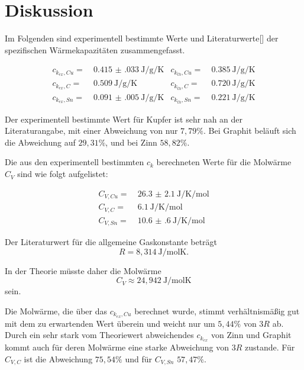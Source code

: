 \section{Diskussion}
\label{sec:Diskussion}

Im Folgenden sind experimentell bestimmte Werte und Literaturwerte[] der spezifischen Wärmekapazitäten zusammengefasst.

\begin{align*}
    c_{k_{ex},Cu} =& \:\SI{0.415(033)}{\joule\per\g\per\kelvin}&   c_{k_{th},Cu} =& \:\SI{0.385}{\joule\per\g\per\kelvin} \\
    c_{k_{ex},C} =& \:\SI{0.509}{\joule\per\g\per\kelvin}&   c_{k_{th},C} =& \:\SI{0,720}{\joule\per\g\per\kelvin} \\
    c_{k_{ex},Sn} =& \:\SI{0.091(005)}{\joule\per\g\per\kelvin}&   c_{k_{th},Sn} =& \:\SI{0.221}{\joule\per\g\per\kelvin} 
\end{align*}

Der experimentell bestimmte Wert für Kupfer ist sehr nah an der Literaturangabe, mit einer Abweichung von nur $7,79\si{\percent}$.
Bei Graphit beläuft sich die Abweichung auf $29,31\si{\percent}$, und bei Zinn $58,82\si{\percent}$. 

Die aus den experimentell bestimmten $c_k$ berechneten Werte für die Molwärme $C_V$ sind wie folgt aufgelistet:

\begin{align*}
    C_{V,Cu}=&\:\SI{26.3(21)}{\joule\per\kelvin\per\mol} \\
    C_{V,C}=&\:\SI{6.1}{\joule\per\kelvin\per\mol} \\
    C_{V,Sn}=&\:\SI{10.6(6)}{\joule\per\kelvin\per\mol}
\end{align*}

Der Literaturwert für die allgemeine Gaskonstante beträgt 
\begin{equation}
    R = 8,314\:\si{\joule\per\mol\kelvin}.
\end{equation}

In der Theorie müsste daher die Molwärme 
\begin{equation}
    C_V \approx 24,942\:\si{\joule\per\mol\kelvin}
\end{equation}
sein. 

Die Molwärme, die über das $c_{k_{ex},Cu}$ berechnet wurde, stimmt verhältnismäßig gut mit dem zu erwartenden Wert überein und weicht
nur um $5,44\si{\percent}$ von $3R$ ab. Durch ein sehr stark vom Theoriewert abweichendes $c_{k_{ex}}$ von Zinn und Graphit kommt auch
für deren Molwärme eine starke Abweichung von $3R$ zustande. Für $C_{V,C}$ ist die Abweichung $75,54\si{\percent}$ und für $C_{V,Sn}$
$57,47\si{\percent}$. 

